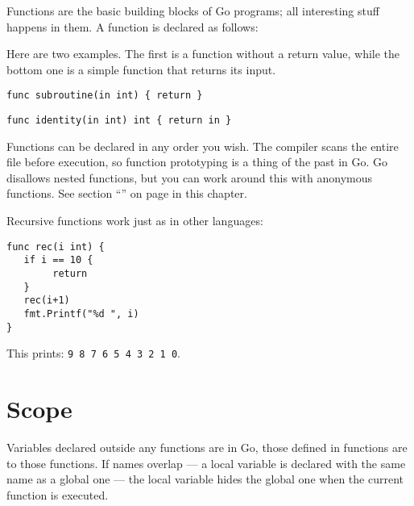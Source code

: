 
\noindent{}Functions are the basic building blocks of Go programs; all interesting
stuff happens in them. A function is declared as follows:

\showremarks
Here are two examples. The first is a function without a return value,
while the bottom one is a simple function that returns its input.

\begin{lstlisting}
func subroutine(in int) { return }
\end{lstlisting}

\begin{lstlisting}
func identity(in int) int { return in }
\end{lstlisting}

Functions can be declared in any order you wish. The compiler scans the
entire file before execution, so function prototyping is a thing of the
past in Go. Go disallows nested functions, but you can work around this with
anonymous functions. See section ``'' on page
\pageref{sec:functions as values} in this chapter.

Recursive functions work just as in other languages:
\begin{lstlisting}[caption=Recursive function]
func rec(i int) {
   if i == 10 {
        return
   }
   rec(i+1)
   fmt.Printf("%d ", i)
}
\end{lstlisting}
This prints: \texttt{9 8 7 6 5 4 3 2 1 0}.
\section{Scope}
Variables declared outside any functions are  in Go, those
defined in functions are  to those functions. If names overlap --- a
local variable is declared with the same name as a global one --- the
local variable hides the global one when the current function is
executed.

\begin{minipage}{.5\textwidth}

\hfill
\vfill
\end{minipage}
\hfill
\begin{minipage}{.5\textwidth}

\hfill
\vfill
\end{minipage}

